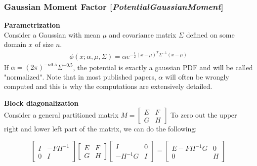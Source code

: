 \documentclass[11pt]{article}
\newcommand{\nllref}[1]{[\small{\textit{#1}}]}
\newcommand{\subsubsubsection}[1]{\noindent\textbf{#1}\\}
\begin{document}
\subsubsection{Gaussian Moment Factor \nllref{PotentialGaussianMoment}}
\subsubsubsection{Parametrization}
Consider a Gaussian with mean $\mu$ and covariance matrix $\Sigma$ defined on some domain $x$ of size $n$.
\begin{align*}
\phi(x; \alpha, \mu, \Sigma) = \alpha  e^{-\frac{1}{2}(x-\mu)^T\Sigma^{-1}(x-\mu)}
\end{align*}
If $\alpha = (2\pi)^{-n0.5} \Sigma^{-0.5}$, the potential is exactly a gaussian PDF and will be called "normalized". Note that in most published papers, $\alpha$ will often be wrongly computed and this is why the computations are extensively detailed.

\subsubsubsection{Block diagonalization}
Consider a general partitioned matrix $M= \left[ \begin{array}{cc} E & F \\ G & H \end{array} \right]$ To zero out the upper right and lower left part of the matrix, we can do the following:

$$
\left[ \begin{array}{cc} I & -FH^{-1} \\ 0 & I \end{array} \right]
\left[ \begin{array}{cc} E & F \\ G & H \end{array} \right]
\left[ \begin{array}{cc} I & 0 \\ -H^{-1}G & I \end{array} \right]
=
\left[ \begin{array}{cc} E-FH^{-1}G & 0 \\ 0 & H \end{array} \right]
$$
\end{document}
